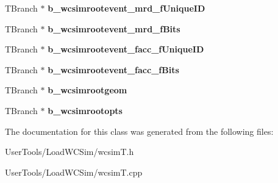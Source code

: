 \begin{DoxyCompactItemize}
\item 
\hypertarget{classwcsimT_add3208592814b127cb437efebc56dc7a}{
TBranch $\ast$ {\bfseries b\_\-wcsimrootevent\_\-mrd\_\-fUniqueID}}
\label{classwcsimT_add3208592814b127cb437efebc56dc7a}

\item 
\hypertarget{classwcsimT_a8a77d09bd9f5e0db5edc099bb0c92192}{
TBranch $\ast$ {\bfseries b\_\-wcsimrootevent\_\-mrd\_\-fBits}}
\label{classwcsimT_a8a77d09bd9f5e0db5edc099bb0c92192}

\item 
\hypertarget{classwcsimT_adaa90ed35bfbf8219f06fb1005e73145}{
TBranch $\ast$ {\bfseries b\_\-wcsimrootevent\_\-facc\_\-fUniqueID}}
\label{classwcsimT_adaa90ed35bfbf8219f06fb1005e73145}

\item 
\hypertarget{classwcsimT_aceacfa8310e04b5cc9bd84826f83579e}{
TBranch $\ast$ {\bfseries b\_\-wcsimrootevent\_\-facc\_\-fBits}}
\label{classwcsimT_aceacfa8310e04b5cc9bd84826f83579e}

\item 
\hypertarget{classwcsimT_ae17702643fb9919f5dcde97a06da5687}{
TBranch $\ast$ {\bfseries b\_\-wcsimrootgeom}}
\label{classwcsimT_ae17702643fb9919f5dcde97a06da5687}

\item 
\hypertarget{classwcsimT_a671b178fc3a440a83c4f40ccb2e31bc7}{
TBranch $\ast$ {\bfseries b\_\-wcsimrootopts}}
\label{classwcsimT_a671b178fc3a440a83c4f40ccb2e31bc7}

\end{DoxyCompactItemize}


The documentation for this class was generated from the following files:\begin{DoxyCompactItemize}
\item 
UserTools/LoadWCSim/wcsimT.h\item 
UserTools/LoadWCSim/wcsimT.cpp\end{DoxyCompactItemize}
